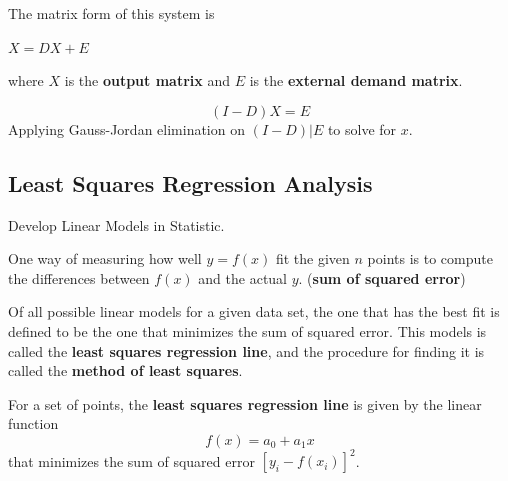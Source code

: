 \documentclass{article}
\newcommand\B{\textbf}
\begin{document}
{    The matrix form of this system is
    \begin{center}
        \begin{tcolorbox}[hbox,    %
       colback = {blue9}]
       $X = DX + E$
\end{tcolorbox}
    \end{center}
    where $X$ is the \B{output matrix} and $E$ is the \B{external demand matrix}.

    \begin{equation*}
        (I - D)X = E
    \end{equation*}
    Applying Gauss-Jordan elimination on $(I - D) | E$ to solve for $x$.

    \subsection{Least Squares Regression Analysis}
    Develop Linear Models in Statistic.

    One way of measuring how well $y = f(x)$ fit the given $n$ points is to compute the differences 
    between $f(x)$ and the actual $y$. (\B{sum of squared error})

    Of all possible linear models for a given data set, the one that has the best fit is defined
    to be the one that minimizes the sum of squared error. This models is called the \B{least
    squares regression line}, and the procedure for finding it is called the \B{method of least
    squares}.

    \begin{tcolorbox}
    For a set of points, the \textbf{least squares regression line} is given by the linear function
    \[f(x) = a_0 + a_1x\]
    that minimizes the sum of squared error $ [y_i - f(x_i)]^2 $.
    \end{tcolorbox}

}
\end{document}
